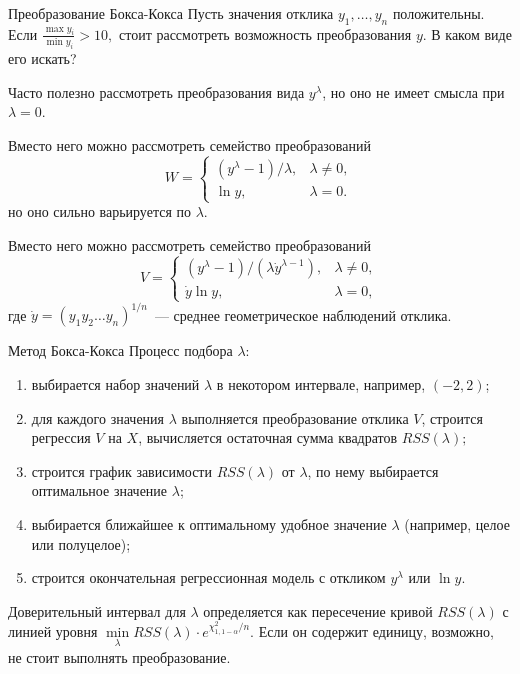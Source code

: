 \documentclass[9pt,pdf,utf8,hyperref={unicode},aspectratio=169]{beamer}
\begin{document}
\begin{frame}{Преобразование Бокса-Кокса}
    Пусть значения отклика $y_1,\dots,y_n$ положительны. Если $\frac{\max y_i}{\min y_i}>10,$ стоит рассмотреть возможность преобразования $y$. В каком виде его искать?

    \bigskip

    Часто полезно рассмотреть преобразования вида $y^\lambda$, но оно не имеет смысла при $\lambda=0.$

    Вместо него можно рассмотреть семейство преобразований
    $$W=\begin{cases}
            \left(y^\lambda-1\right)/\lambda, & \lambda\neq 0, \\
            \ln y, & \lambda=0.
        \end{cases}
    $$
    но оно сильно варьируется по $\lambda$.

    Вместо него можно рассмотреть семейство преобразований
    $$V=\begin{cases}
            \left(y^\lambda-1\right)/\left(\lambda \dot{y}^{\lambda-1}\right), & \lambda\neq 0, \\
            \dot{y}\ln y, & \lambda=0,
        \end{cases}
    $$
    где $\dot{y} = \left(y_1y_2\dots y_n\right)^{1/n}$~--- среднее геометрическое наблюдений отклика.
\end{frame}

\begin{frame}{Метод Бокса-Кокса}
    Процесс подбора $\lambda$:
    \begin{enumerate}
    \item выбирается набор значений $\lambda$ в некотором интервале, например, $\left(-2,2\right)$;
    \item для каждого значения $\lambda$ выполняется преобразование отклика $V$, строится регрессия $V$ на $X$, вычисляется остаточная сумма квадратов $RSS(\lambda);$
    \item строится график зависимости $RSS(\lambda)$ от $\lambda$, по нему выбирается оптимальное значение $\lambda$;
    \item выбирается ближайшее к оптимальному удобное значение $\lambda$ (например, целое или полуцелое);
    \item строится окончательная регрессионная модель с откликом $y^\lambda$ или $\ln y$.
    \end{enumerate}

    \bigskip

    Доверительный интервал для $\lambda$ определяется как пересечение кривой $RSS\left(\lambda\right)$ с линией уровня $\min\limits_{\lambda} RSS\left(\lambda\right) \cdot e^{\chi_{1, 1-\alpha}^2/n}.$
    Если он содержит единицу, возможно, не стоит выполнять преобразование.
\end{frame}
\end{document}
